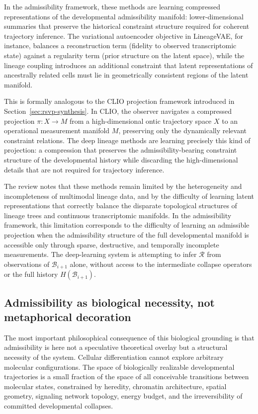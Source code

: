 \documentclass[12pt, a4paper]{article}
\theoremstyle{plain}
\theoremstyle{definition}
\theoremstyle{remark}
\newcommand{\Rcal}{\mathcal{R}}
\newcommand{\Bcal}{\mathcal{B}}
\begin{document}
In the admissibility framework, these methods are learning compressed
representations of the developmental admissibility manifold: lower-dimensional
summaries that preserve the historical constraint structure required for
coherent trajectory inference.
The variational autoencoder objective in LineageVAE, for instance, balances
a reconstruction term (fidelity to observed transcriptomic state) against
a regularity term (prior structure on the latent space), while the lineage
coupling introduces an additional constraint that latent representations
of ancestrally related cells must lie in geometrically consistent regions
of the latent manifold.

This is formally analogous to the CLIO projection framework introduced
in Section~\ref{sec:rsvp-synthesis}.
In CLIO, the observer navigates a compressed projection $\pi : X \to M$
from a high-dimensional ontic trajectory space $X$ to an operational
measurement manifold $M$, preserving only the dynamically relevant
constraint relations.
The deep lineage methods are learning precisely this kind of projection:
a compression that preserves the admissibility-bearing constraint
structure of the developmental history while discarding the high-dimensional
details that are not required for trajectory inference.

The review notes that these methods remain limited by the heterogeneity
and incompleteness of multimodal lineage data, and by the difficulty of
learning latent representations that correctly balance the disparate
topological structures of lineage trees and continuous transcriptomic
manifolds.
In the admissibility framework, this limitation corresponds to the
difficulty of learning an admissible projection when the admissibility
structure of the full developmental manifold is accessible only through
sparse, destructive, and temporally incomplete measurements.
The deep-learning system is attempting to infer $\Rcal$ from observations
of $\Bcal_{i+1}$ alone, without access to the intermediate collapse
operators or the full history $H(\Bcal_{i+1})$.

\subsection{Admissibility as biological necessity, not metaphorical decoration}

The most important philosophical consequence of this biological grounding
is that admissibility is here not a speculative theoretical overlay but a
structural necessity of the system.
Cellular differentiation cannot explore arbitrary molecular configurations.
The space of biologically realizable developmental trajectories is a small
fraction of the space of all conceivable transitions between molecular
states, constrained by heredity, chromatin architecture, spatial geometry,
signaling network topology, energy budget, and the irreversibility of
committed developmental collapses.
\end{document}
